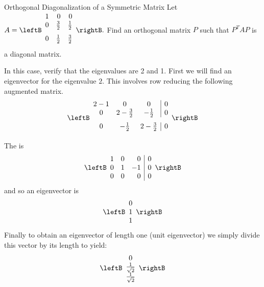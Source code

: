 \begin{example}{Orthogonal Diagonalization of a Symmetric Matrix}\label{exa:orthogonaldiagonalization}
Let $A=\leftB
\begin{array}{rrr}
1 & 0 & 0 \\
0 & \vspace{0.05in}\frac{3}{2} & \vspace{0.05in}\frac{1}{2} \\
0 & \vspace{0.05in}\frac{1}{2} & \vspace{0.05in}\frac{3}{2}
\end{array}
\rightB .$ 
Find an orthogonal matrix $P$ such that $P^{T}AP$ is a diagonal
matrix.
\end{example}

\begin{solution}
In this case, verify that the eigenvalues are 2 and 1. First
we will find an eigenvector for the eigenvalue $2$. This involves row
reducing the following augmented matrix. 
\begin{equation*}
\leftB 
\begin{array}{ccc|c}
2 - 1 & 0 & 0 & 0 \\ 
0 & 2-\vspace{0.05in}\frac{3}{2} & -\vspace{0.05in}\frac{1}{2} & 0 \\ 
0 & -\vspace{0.05in}\frac{1}{2} & 2-\vspace{0.05in}\frac{3}{2} & 0
\end{array}
\rightB
\end{equation*}
The \rref \;is 
\begin{equation*}
\leftB 
\begin{array}{rrr|r}
1 & 0 & 0 & 0 \\ 
0 & 1 & -1 & 0 \\ 
0 & 0 & 0 & 0
\end{array}
\rightB
\end{equation*}
and so an eigenvector is 
\begin{equation*}
\leftB 
\begin{array}{c}
0 \\ 
1 \\ 
1
\end{array}
\rightB 
\end{equation*}
Finally to obtain an eigenvector of length one (unit eigenvector) we simply  divide this vector by its length to yield:
\begin{equation*}
\leftB 
\begin{array}{c}
0 \\ 
\frac{1}{\sqrt{2}} \\ 
\frac{1}{\sqrt{2}}
\end{array}
\rightB 
\end{equation*}


\end{solution}
